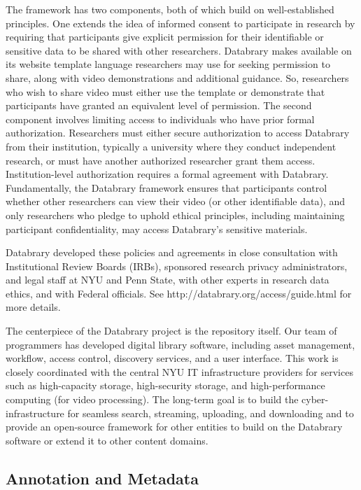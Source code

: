 \documentclass{sig-alternate}
\begin{document}
The framework has two components, both of which build on
well-established principles. One extends the idea of informed consent to
participate in research by requiring that participants give explicit
permission for their identifiable or sensitive data to be shared with
other researchers. Databrary makes available on its website template
language researchers may use for seeking permission to share, along with
video demonstrations and additional guidance. So, researchers who wish
to share video must either use the template or demonstrate that
participants have granted an equivalent level of permission. The second
component involves limiting access to individuals who have prior formal
authorization. Researchers must either secure authorization to access
Databrary from their institution, typically a university where they
conduct independent research, or must have another authorized researcher
grant them access. Institution-level authorization requires a formal
agreement with Databrary. Fundamentally, the Databrary framework ensures
that participants control whether other researchers can view their video
(or other identifiable data), and only researchers who pledge to uphold
ethical principles, including maintaining participant confidentiality,
may access Databrary's sensitive materials.

Databrary developed these policies and agreements in close consultation
with Institutional Review Boards (IRBs), sponsored research privacy
administrators, and legal staff at NYU and Penn State, with other
experts in research data ethics, and with Federal officials. See
http://databrary.org/access/guide.html for more details.

The centerpiece of the Databrary project is the repository itself. Our
team of programmers has developed digital library software, including
asset management, workflow, access control, discovery services, and a
user interface. This work is closely coordinated with the central NYU IT
infrastructure providers for services such as high-capacity storage,
high-security storage, and high-performance computing (for video
processing). The long-term goal is to build the cyber-infrastructure for
seamless search, streaming, uploading, and downloading and to provide an
open-source framework for other entities to build on the Databrary
software or extend it to other content domains.

\subsection{Annotation and Metadata}
\end{document}
